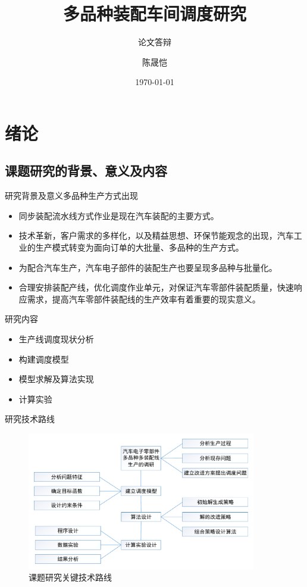 \documentclass{beamer}
\title{多品种装配车间调度研究}
\subtitle{论文答辩}
\author{陈晟恺}
\institute[diufanshu@gmail.com]{健行理工1001~~201002750102\\ 指导老师：鲁建厦、董巧英 }
\date{\today}
\begin{document}
\newtheorem{thm}{定理}
\begin{frame}
\titlepage
{}
\end{frame}
\section{绪论}
\subsection{课题研究的背景、意义及内容}
\begin{frame}{研究背景及意义}{多品种生产方式出现}
\begin{itemize}[<+-| alert@+>]
\item 同步装配流水线方式作业是现在汽车装配的主要方式。
\item 技术革新，客户需求的多样化，以及精益思想、环保节能观念的出现，汽车工业的生产模式转变为面向订单的大批量、多品种的生产方式。
\item 为配合汽车生产，汽车电子部件的装配生产也要呈现多品种与批量化。
\item 合理安排装配产线，优化调度作业单元，对保证汽车零部件装配质量，快速响应需求，提高汽车零部件装配线的生产效率有着重要的现实意义。
\end{itemize}
\end{frame}

\begin{frame}{研究内容}
\begin{itemize}[<+-| alert@+>]
\item 生产线调度现状分析
\item 构建调度模型
\item 模型求解及算法实现
\item 计算实验
\end{itemize}
\end{frame}
\begin{frame}{研究技术路线}
\begin{figure}
\centering
\includegraphics[width = 10cm]{techroute1.pdf}
\caption{课题研究关键技术路线}
\end{figure}
\end{frame}
\end{document}
